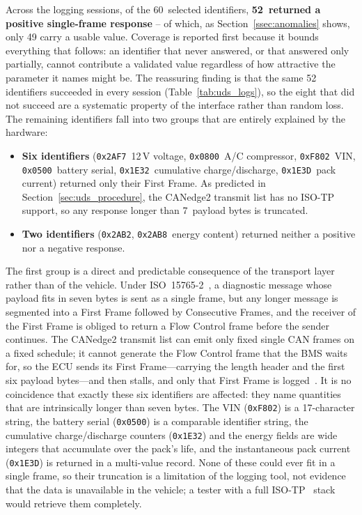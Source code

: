 \documentclass[11pt,a4paper,oneside,parskip=half]{scrreprt}
\providecommand{\hex}{}\renewcommand{\hex}[1]{\texttt{0x#1}}
\begin{document}
Across the logging sessions, of the 60~selected identifiers, \textbf{52~returned a positive single-frame response} -- of which, as Section~\ref{ssec:anomalies} shows, only 49 carry a usable value. Coverage is reported first because it bounds everything that follows: an identifier that never answered, or that answered only partially, cannot contribute a validated value regardless of how attractive the parameter it names might be. The reassuring finding is that the same 52 identifiers succeeded in every session (Table~\ref{tab:uds_logs}), so the eight that did not succeed are a systematic property of the interface rather than random loss. The remaining identifiers fall into two groups that are entirely explained by the hardware:

\begin{itemize}
  \item \textbf{Six identifiers} (\hex{2AF7}~12\,V voltage, \hex{0800}~A/C compressor, \hex{F802}~VIN, \hex{0500}~battery serial, \hex{1E32}~cumulative charge/dis\-charge, \hex{1E3D}~pack current) returned only their First Frame. As predicted in Section~\ref{sec:uds_procedure}, the CANedge2 transmit list has no ISO-TP support, so any response longer than 7~payload bytes is truncated.
  \item \textbf{Two identifiers} (\hex{2AB2}, \hex{2AB8}~energy content) returned neither a positive nor a negative response.
\end{itemize}

The first group is a direct and predictable consequence of the transport layer rather than of the vehicle. Under ISO~15765-2~\cite{iso15765}, a diagnostic message whose payload fits in seven bytes is sent as a single frame, but any longer message is segmented into a First Frame followed by Consecutive Frames, and the receiver of the First Frame is obliged to return a Flow Control frame before the sender continues. The CANedge2 transmit list can emit only fixed single CAN frames on a fixed schedule; it cannot generate the Flow Control frame that the BMS waits for, so the ECU sends its First Frame---carrying the length header and the first six payload bytes---and then stalls, and only that First Frame is logged~\cite{csselectronics_canedge2}. It is no coincidence that exactly these six identifiers are affected: they name quantities that are intrinsically longer than seven bytes. The VIN (\hex{F802}) is a 17-character string, the battery serial (\hex{0500}) is a comparable identifier string, the cumulative charge/discharge counters (\hex{1E32}) and the energy fields are wide integers that accumulate over the pack's life, and the instantaneous pack current (\hex{1E3D}) is returned in a multi-value record. None of these could ever fit in a single frame, so their truncation is a limitation of the logging tool, not evidence that the data is unavailable in the vehicle; a tester with a full ISO-TP~\cite{iso15765} stack would retrieve them completely.
\end{document}
